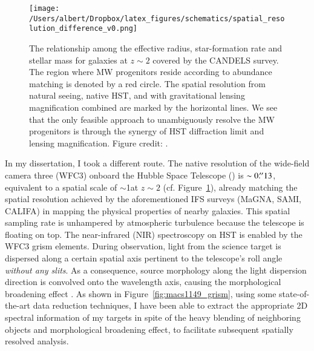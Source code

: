 \begin{figure}
    \centering
    \texttt{[image: /Users/albert/Dropbox/latex\_figures/schematics/spatial\_resolution\_difference\_v0.png]}
    \caption[The relationship among the effective radius, star-formation rate and stellar mass for galaxies at
    $z\sim2$.]{The relationship among the effective radius, star-formation rate and stellar mass for galaxies at $z\sim2$ covered by the CANDELS survey.
    The region where MW progenitors reside according to abundance matching is denoted by a red circle.
    The spatial resolution from natural seeing, native HST, and with gravitational lensing magnification combined
    are marked by the horizontal lines.
    We see that the only feasible approach to unambiguously resolve the MW progenitors is through the synergy of HST
    diffraction limit and lensing magnification.
    Figure credit: \citet{Wuyts:2012iw}.
    \label{fig:spatial_resolution}}
\end{figure}

In my dissertation, I took a different route.  The native resolution of the wide-field camera three (WFC3)
onboard the Hubble Space Telescope (\hst) is $\sim0\mbox{$.\!^{\prime\prime}$}13$, equivalent to a spatial scale of $\sim$1\kpc at
$z\sim2$ (cf.  Figure~\ref{fig:spatial_resolution}), already matching the spatial resolution achieved by the
aforementioned IFS surveys (\ie MaGNA, SAMI, CALIFA) in mapping the physical properties of nearby galaxies.  This
spatial sampling rate is unhampered by atmospheric turbulence because the telescope is floating on top.  The
near-infrared (NIR) spectroscopy on HST is enabled by the WFC3 grism elements.  During observation, light from the
science target is dispersed along a certain spatial axis pertinent to the telescope's roll angle \emph{without
any slits}.  As a consequence, source morphology along the light dispersion direction is convolved onto the
wavelength axis, causing the morphological broadening effect \citep{vanDokkum:2011cq}.  As shown in
Figure~\ref{fig:macs1149_grism}, using some state-of-the-art data reduction techniques, I have been able to
extract the appropriate 2D spectral information of my targets in spite of the heavy blending of neighboring
objects and morphological broadening effect, to facilitate subsequent spatially resolved analysis.

